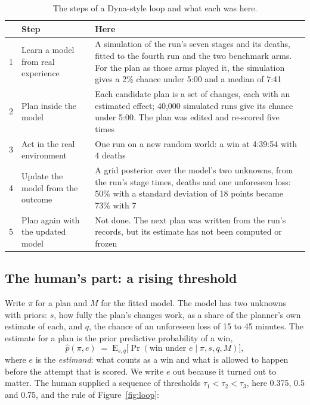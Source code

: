 \documentclass[11pt,a4paper]{article}
\begin{document}
\begin{table}[!tbp]
\caption{The steps of a Dyna-style loop and what each was here.}
\label{tab:dyna}
\small
\begin{tabularx}{\textwidth}{@{}l>{\raggedright\arraybackslash}p{}>{\raggedright\arraybackslash}X@{}}
\toprule
 & Step & Here \\
\midrule
1 & Learn a model from real experience & A simulation of the run's seven stages and its deaths, fitted to the fourth run and the two benchmark arms. For the plan as those arms played it, the simulation gives a 2\% chance under 5:00 and a median of 7:41 \\
2 & Plan inside the model & Each candidate plan is a set of changes, each with an estimated effect; 40,000 simulated runs give its chance under 5:00. The plan was edited and re-scored five times \\
3 & Act in the real environment & One run on a new random world: a win at 4:39:54 with 4 deaths \\
4 & Update the model from the outcome & A grid posterior over the model's two unknowns, from the run's stage times, deaths and one unforeseen loss: 50\% with a standard deviation of 18 points became 73\% with 7 \\
5 & Plan again with the updated model & Not done. The next plan was written from the run's records, but its estimate has not been computed or frozen \\
\bottomrule
\end{tabularx}
\end{table}

\subsection{The human's part: a rising threshold}

Write $\pi$ for a plan and $M$ for the fitted model. The model has two unknowns with priors: $s$, how fully the plan's changes work, as a share of the planner's own estimate of each, and $q$, the chance of an unforeseen loss of 15 to 45 minutes. The estimate for a plan is the prior predictive probability of a win,
\[
\hat p(\pi, e) \;=\; \mathrm{E}_{s,q}\big[\Pr(\mbox{win under } e \mid \pi, s, q, M)\big],
\]
where $e$ is the \emph{estimand}: what counts as a win and what is allowed to happen before the attempt that is scored. We write $e$ out because it turned out to matter. The human supplied a sequence of thresholds $\tau_1 < \tau_2 < \tau_3$, here 0.375, 0.5 and 0.75, and the rule of Figure~\ref{fig:loop}:
\end{document}
